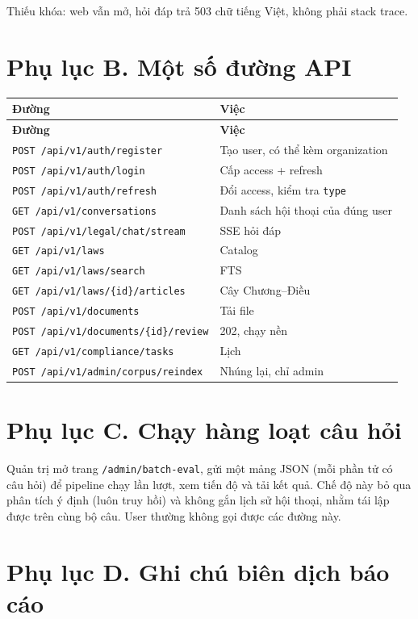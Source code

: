 Thiếu khóa: web vẫn mở, hỏi đáp trả 503 chữ tiếng Việt, không phải stack trace.

\section*{Phụ lục B. Một số đường API}

\begin{longtable}{p{6.6cm}p{7.2cm}}
\toprule
\textbf{Đường} & \textbf{Việc} \\
\midrule
\endfirsthead
\toprule
\textbf{Đường} & \textbf{Việc} \\
\midrule
\endhead
\texttt{POST /api/v1/auth/register} & Tạo user, có thể kèm organization \\
\texttt{POST /api/v1/auth/login} & Cấp access + refresh \\
\texttt{POST /api/v1/auth/refresh} & Đổi access, kiểm tra \texttt{type} \\
\texttt{GET /api/v1/conversations} & Danh sách hội thoại của đúng user \\
\texttt{POST /api/v1/legal/chat/stream} & SSE hỏi đáp \\
\texttt{GET /api/v1/laws} & Catalog \\
\texttt{GET /api/v1/laws/search} & FTS \\
\texttt{GET /api/v1/laws/\{id\}/articles} & Cây Chương--Điều \\
\texttt{POST /api/v1/documents} & Tải file \\
\texttt{POST /api/v1/documents/\{id\}/review} & 202, chạy nền \\
\texttt{GET /api/v1/compliance/tasks} & Lịch \\
\texttt{POST /api/v1/admin/corpus/reindex} & Nhúng lại, chỉ admin \\
\bottomrule
\end{longtable}

\section*{Phụ lục C. Chạy hàng loạt câu hỏi}

Quản trị mở trang \texttt{/admin/batch-eval}, gửi một mảng JSON (mỗi phần tử có
câu hỏi) để pipeline chạy lần lượt, xem tiến độ và tải kết quả. Chế độ này bỏ
qua phân tích ý định (luôn truy hồi) và không gắn lịch sử hội thoại, nhằm tái
lập được trên cùng bộ câu. User thường không gọi được các đường này.

\section*{Phụ lục D. Ghi chú biên dịch báo cáo}

